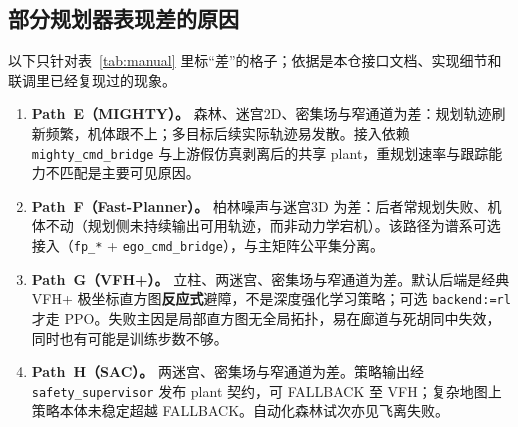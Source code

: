 
\subsection{部分规划器表现差的原因}

以下只针对表~\ref{tab:manual} 里标“差”的格子；依据是本仓接口文档、实现细节和联调里已经复现过的现象。

\begin{enumerate}[leftmargin=1.6em,itemsep=0.45em,parsep=0.15em]
  \item \textbf{Path~E（MIGHTY）。}
  森林、迷宫2D、密集场与窄通道为差：规划轨迹刷新频繁，机体跟不上；多目标后续实际轨迹易发散。接入依赖 \texttt{mighty\_cmd\_bridge} 与上游假仿真剥离后的共享 plant，重规划速率与跟踪能力不匹配是主要可见原因。

  \item \textbf{Path~F（Fast-Planner）。}
  柏林噪声与迷宫3D 为差：后者常规划失败、机体不动（规划侧未持续输出可用轨迹，而非动力学宕机）。该路径为谱系可选接入（\texttt{fp\_*} + \texttt{ego\_cmd\_bridge}），与主矩阵公平集分离。

  \item \textbf{Path~G（VFH+）。}
  立柱、两迷宫、密集场与窄通道为差。默认后端是经典 VFH+ 极坐标直方图\textbf{反应式}避障，不是深度强化学习策略；可选 \texttt{backend:=rl} 才走 PPO。失败主因是局部直方图无全局拓扑，易在廊道与死胡同中失效，同时也有可能是训练步数不够。

  \item \textbf{Path~H（SAC）。}
  两迷宫、密集场与窄通道为差。策略输出经 \texttt{safety\_supervisor} 发布 plant 契约，可 FALLBACK 至 VFH；复杂地图上策略本体未稳定超越 FALLBACK。自动化森林试次亦见飞离失败。
\end{enumerate}

